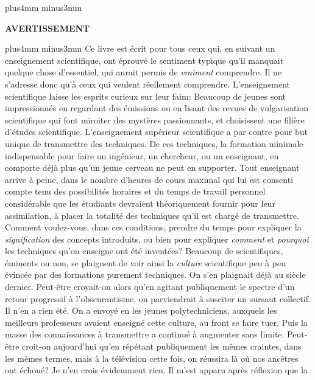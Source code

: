 


\null 
\vskip10mm plus4mm minus3mm 
 
\centerline{\bf AVERTISSEMENT} 
\vskip8mm plus4mm minus3mm 
Ce livre est \'ecrit pour tous ceux qui, en suivant un enseignement 
scientifique, ont \'eprouv\'e le sentiment typique qu'il manquait quelque  
chose d'essentiel, qui aurait permis de {\it vraiment} comprendre. Il 
ne s'adresse donc qu'\`a ceux qui veulent r\'eellement comprendre. 
\medskip 
L'enseignement scientifique laisse les esprits curieux sur leur faim: 
Beaucoup de jeunes sont impressionn\'es en regardant des \'emissions  
ou  en  lisant des revues de vulgarisation scientifique qui font miroiter 
des myst\`eres  passionnants,  et choisissent une fili\`ere d'\'etudes 
scientifique. L'enseignement sup\'erieur scientifique a par contre pour 
but unique de transmettre des techniques. De ces techniques, la formation 
minimale indispensable pour faire un ing\'enieur, un chercheur, ou un 
enseignant, en comporte d\'ej\`a plus  qu'un jeune cerveau ne peut en 
supporter. Tout enseignant arrive \`a peine, dans le nombre d'heures de 
cours maximal qui lui est consenti compte tenu des possibilit\'es  
horaires et du temps de travail personnel consid\'erable que les 
\'etudiants devraient th\'eoriquement fournir pour leur assimilation, \`a 
placer la  totalit\'e des techniques qu'il est charg\'e de transmettre. 
Comment voulez-vous, dans ces conditions, prendre du temps pour 
expliquer la {\it signification} des concepts introduits, ou bien pour 
expliquer {\it comment} et {\it pourquoi} les techniques qu'on enseigne 
ont \'et\'e invent\'ees?    
\medskip 
Beaucoup de scientifiques, \'eminents ou non, se plaignent  de voir ainsi 
la {\it culture} scientifique peu \`a peu \'evinc\'ee par des formations 
purement techniques. On s'en plaignait d\'ej\`a au si\`ecle dernier. 
Peut-\^etre croyait-on alors qu'en agitant publiquement le spectre 
d'un retour progressif \`a l'obscurantisme, on parviendrait \`a 
susciter un sursaut collectif. Il n'en a rien \'et\'e. On a envoy\'e en 
{} les jeunes polytechniciens, auxquels les meilleurs 
professeurs avaient enseign\'e cette culture, au front se faire tuer. 
Puis la masse des connaissances \`a transmettre a continu\'e \`a 
augmenter sans limite. Peut-\^etre croit-on aujourd'hui qu'en r\'ep\'etant 
publiquement les m\^emes craintes, dans les m\^emes termes, mais 
\`a la t\'el\'evision cette fois, on r\'eussira l\`a o\`u nos anc\^etres ont 
\'echou\'e?  
\medskip 
Je n'en crois \'evidemment rien. Il m'est apparu apr\`es r\'eflexion que la 
